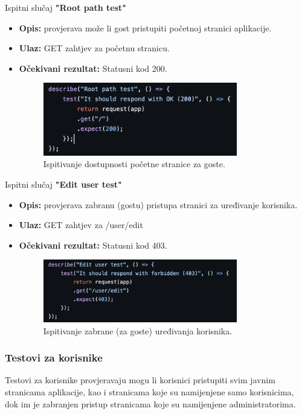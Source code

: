 			Ispitni slučaj \textbf{"Root path test"}
			\begin{itemize}
				\item \textbf{Opis:} provjerava može li gost pristupiti početnoj stranici aplikacije.
				\item \textbf{Ulaz:} GET zahtjev za početnu stranicu.
				\item \textbf{Očekivani rezultat:} Statusni kod 200.
				\begin{figure}[h]
					\centering
					\includegraphics[width=0.8\textwidth]{slike/testovi/guest_root_test.png}
					\caption{Ispitivanje dostupnosti početne stranice za goste.}
					\label{fig:testovi_gosti_slika}
				\end{figure}
			\end{itemize}

			Ispitni slučaj \textbf{"Edit user test"}
			\begin{itemize}
				\item \textbf{Opis:} provjerava zabranu (gostu) pristupa stranici za uređivanje korisnika.
				\item \textbf{Ulaz:} GET zahtjev za /user/edit
				\item \textbf{Očekivani rezultat:} Statusni kod 403.
				\begin{figure}[h]
					\centering
					\includegraphics[width=0.8\textwidth]{slike/testovi/guest_edit_profile_test.png}
					\caption{Ispitivanje zabrane (za goste) uređivanja korisnika.}
					\label{fig:testovi_gosti_slika}
				\end{figure}
			\end{itemize}
			\newpage
			
			\subsubsection{Testovi za korisnike}
			Testovi za korisnike provjeravaju mogu li korisnici pristupiti svim javnim stranicama aplikacije,
			kao i stranicama koje su namijenjene samo korisnicima, dok im je zabranjen pristup stranicama koje su namijenjene administratorima.
			\\

